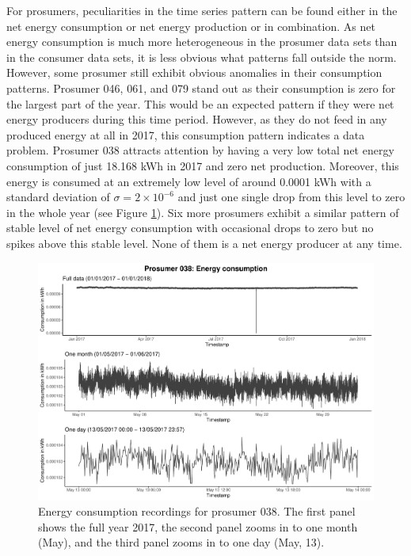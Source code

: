 For prosumers, peculiarities in the time series pattern can be found either in the net energy consumption or net energy production or in combination. As net energy consumption is much more heterogeneous in the prosumer data sets than in the consumer data sets, it is less obvious what patterns fall outside the norm. However,  some prosumer still exhibit obvious anomalies in their consumption patterns. Prosumer 046, 061, and 079 stand out as their consumption is zero for the largest part of the year. This would be an expected pattern if they were net energy producers during this time period. However, as they do not feed in any produced energy at all in 2017, this consumption pattern indicates a data problem. 
Prosumer 038 attracts attention by having a very low total net energy consumption of just 18.168 kWh in 2017 and zero net production. Moreover, this energy is consumed at an extremely low level of around 0.0001 kWh with a standard deviation of $\sigma=2\times10^{-6}$ and just one single drop from this level to zero in the whole year (see Figure \ref{Fig:energycons_p038}). Six more prosumers exhibit a similar pattern of stable level of net energy consumption with occasional drops to zero but no spikes above this stable level. None of them is a net energy producer at any time.

\begin{figure}[htbp]
 \centering
\includegraphics[width=\textwidth]{thesis/graphs/timeseries/p038_cons.pdf}
\caption[Energy consumption recordings for prosumer 038]{Energy consumption recordings for prosumer 038. The first panel shows the full year 2017, the second panel zooms in to one month (May), and the third panel zooms in to one day (May, 13). \quantnet}
\label{Fig:energycons_p038}
\end{figure}

